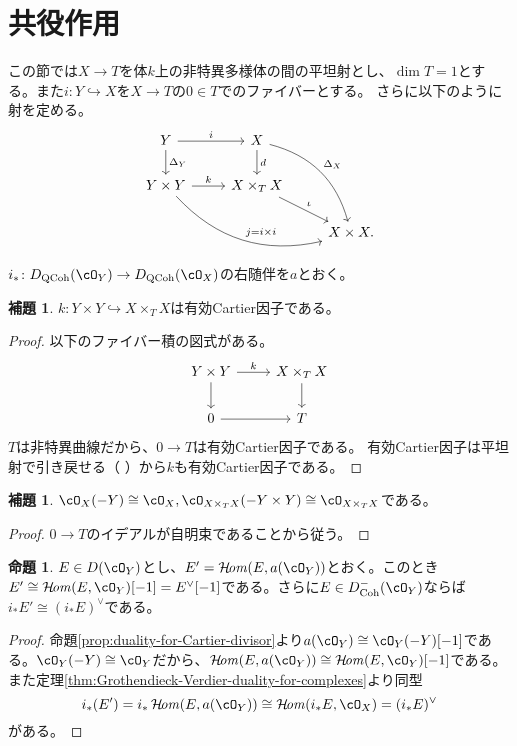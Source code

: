 \documentclass[uplatex, a4paper, dvipdfmx]{jsarticle}
\theoremstyle{definition}
\newtheorem{proposition}[theorem]{命題}
\newtheorem{lemma}[theorem]{補題}
\DeclareMathOperator{\CHom}{\mathcal{H}\!\mathit{om}}
\DeclareMathOperator{\Coh}{\mathrm{Coh}}
\DeclareMathOperator{\QCoh}{\mathrm{QCoh}}
\begin{document}
\section{共役作用}
この節では$X \to T$を体$k$上の非特異多様体の間の平坦射とし、$\dim T = 1$とする。また$i \colon Y \hookrightarrow X$を$X \to T$の$0 \in T$でのファイバーとする。
さらに以下のように射を定める。
\[
    \begin{tikzcd}
        Y \arrow[r,"i"]\arrow[d, "\Delta_Y"] & X \arrow[d,"d"]\arrow[rdd, bend left, "\Delta_X"]&\\
        Y \times Y \arrow[r, "k"]\arrow[rrd, bend right, "j=i \times i"]& X \times_T X\arrow[rd, "\iota"]&\\
        & & X \times X.
    \end{tikzcd}
\]
$i_* \colon D_{\QCoh}(\cO_Y) \to D_{\QCoh}(\cO_X)$の右随伴を$a$とおく。
\begin{lemma}
    $k \colon Y \times Y \hookrightarrow X \times_T X$は有効Cartier因子である。
\end{lemma}
\begin{proof}
    以下のファイバー積の図式がある。
    \[
        \begin{tikzcd}
            Y \times Y \arrow[r, "k"]\arrow[d] & X \times_T X \arrow[d]\\
            0 \arrow[r]& T
        \end{tikzcd}
    \]
    $T$は非特異曲線だから、$0 \to T$は有効Cartier因子である。
    有効Cartier因子は平坦射で引き戻せる（  {\cite[\href{https://stacks.math.columbia.edu/tag/02OO}{Tag 02OO}]{stacks-project}}）から$k$も有効Cartier因子である。
\end{proof}
\begin{lemma}
    $\cO_X(-Y) \cong \cO_X, \cO_{X \times_T X}(-Y\times Y) \cong \cO_{X \times_T X}$である。
\end{lemma}
\begin{proof}
    $0 \to T$のイデアルが自明束であることから従う。
\end{proof}
\begin{proposition}
    $E \in D(\cO_Y)$とし、$E' = \CHom(E, a(\cO_Y))$とおく。このとき$E'\cong \CHom(E, \cO_Y)[-1] = E^\vee[-1]$である。さらに$E \in D_{\Coh}^-(\cO_Y)$ならば$i_*E' \cong (i_*E)^\vee$である。
\end{proposition}
\begin{proof}
    命題\ref{prop:duality-for-Cartier-divisor}より$a(\cO_Y) \cong \cO_Y(-Y)[-1]$である。$\cO_Y(-Y) \cong \cO_Y$だから、$\CHom(E, a(\cO_Y)) \cong \CHom(E, \cO_Y)[-1]$である。
    また定理\ref{thm:Grothendieck-Verdier-duality-for-complexes}より同型
    \begin{equation}
        i_*(E') = i_* \CHom(E, a(\cO_Y)) \cong \CHom(i_*E, \cO_X) = (i_*E)^\vee
    \end{equation}
    がある。
\end{proof}
\end{document}
